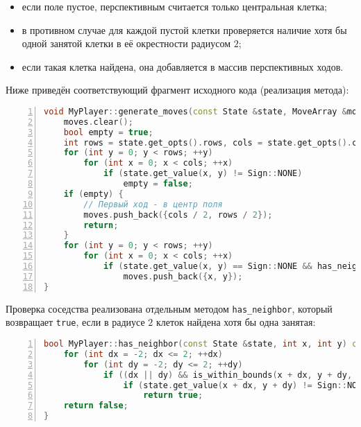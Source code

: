 \begin{itemize}
    \item если поле пустое, перспективным считается только центральная клетка;
    \item в противном случае для каждой пустой клетки проверяется наличие хотя бы одной занятой клетки в её окрестности радиусом $2$;
    \item если такая клетка найдена, она добавляется в массив перспективных ходов.
\end{itemize}

\vspace{1ex}

Ниже приведён соответствующий фрагмент исходного кода (реализация метода):

\begin{lstlisting}[language=C++,caption={Генерация перспективных ходов},label={lst:generate_moves},numbers=left]
void MyPlayer::generate_moves(const State &state, MoveArray &moves) const {
    moves.clear();
    bool empty = true;
    int rows = state.get_opts().rows, cols = state.get_opts().cols;
    for (int y = 0; y < rows; ++y)
        for (int x = 0; x < cols; ++x)
            if (state.get_value(x, y) != Sign::NONE)
                empty = false;
    if (empty) {
        // Первый ход - в центр поля
        moves.push_back({cols / 2, rows / 2});
        return;
    }
    for (int y = 0; y < rows; ++y)
        for (int x = 0; x < cols; ++x)
            if (state.get_value(x, y) == Sign::NONE && has_neighbor(state, x, y))
                moves.push_back({x, y});
}
\end{lstlisting}

\vspace{1ex}

\noindent Проверка соседства реализована отдельным методом \texttt{has\_neighbor}, который возвращает \texttt{true}, если в радиусе $2$ клеток найдена хотя бы одна занятая:

\begin{lstlisting}[language=C++,caption={Проверка наличия соседа у клетки},label={lst:has_neighbor},numbers=left]
bool MyPlayer::has_neighbor(const State &state, int x, int y) const {
    for (int dx = -2; dx <= 2; ++dx)
        for (int dy = -2; dy <= 2; ++dy)
            if ((dx || dy) && is_within_bounds(x + dx, y + dy, state))
                if (state.get_value(x + dx, y + dy) != Sign::NONE)
                    return true;
    return false;
}
\end{lstlisting}

\vspace{1ex}

